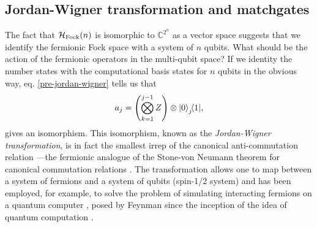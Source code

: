 

\subsection{Jordan-Wigner transformation and matchgates}\label{ch5:matchgate}

The fact that $\mathcal{H}_{\text{Fock}}(n)$ is isomorphic to $\mathbb{C}^{2^n}$ as a vector space suggests that we identify the fermionic Fock space with a system of $n$ qubits. What should be the action of the fermionic operators in the multi-qubit space? If we identity the number states with the computational basis states for $n$ qubits in the obvious way, eq. \eqref{pre-jordan-wigner} tells us that
\begin{align}
a_j = \left( \bigotimes_{k=1}^{j-1} Z \right) \otimes  {\left\vert{0}\right\rangle}_j\!{\left\langle{1}\right\vert},
\end{align}
gives an isomorphism. This isomorphism, known as the \emph{Jordan-Wigner transformation}, is in fact the smallest irrep of the canonical anti-commutation relation ---the fermionic analogue of the Stone-von Neumann theorem for canonical commutation relations \cite{Derezinski}. The transformation allows one to map between a system of fermions and a system of qubits (spin-1/2 system) and has been employed, for example, to solve the problem of simulating interacting fermions on a quantum computer \cite{ortiz_quantum_2001}, posed by Feynman since the inception of the idea of quantum computation \cite{feynman_simulating_1982}.

